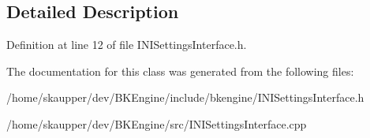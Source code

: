 \subsection{Detailed Description}


Definition at line 12 of file I\+N\+I\+Settings\+Interface.\+h.



The documentation for this class was generated from the following files\+:\begin{DoxyCompactItemize}
\item 
/home/skaupper/dev/\+B\+K\+Engine/include/bkengine/I\+N\+I\+Settings\+Interface.\+h\item 
/home/skaupper/dev/\+B\+K\+Engine/src/I\+N\+I\+Settings\+Interface.\+cpp\end{DoxyCompactItemize}
